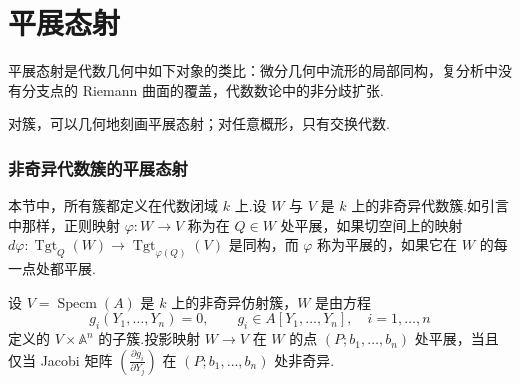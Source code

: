 ﻿%
\chapter{平展态射}\label{sec:2}

平展态射是代数几何中如下对象的类比：微分几何中流形的局部同构，复分析中没有分支点的 Riemann 曲面的覆盖，代数数论中的非分歧扩张.

对簇，可以几何地刻画平展态射；对任意概形，只有交换代数.

\subsection*{非奇异代数簇的平展态射}

本节中，所有簇都定义在代数闭域 $k$ 上.设 $W$ 与 $V$ 是 $k$ 上的非奇异代数簇.如引言中那样，正则映射 $\varphi \colon W \to V$ 称为在 $Q \in W$ 处平展，如果切空间上的映射 $d\varphi \colon \operatorname{Tgt}_{Q}(W) \to \operatorname{Tgt}_{\varphi(Q)}(V)$ 是同构，而 $\varphi$ 称为平展的，如果它在 $W$ 的每一点处都平展.

\begin{proposition}\label{prop:2.1}
设 $V = \operatorname{Specm}(A)$ 是 $k$ 上的非奇异仿射簇，$W$ 是由方程
\[
g_{i}(Y_1, \ldots, Y_n) = 0, \qquad g_{i} \in A[Y_1, \ldots, Y_n], \quad i = 1, \ldots, n
\]
定义的 $V \times \mathbb{A}^{n}$ 的子簇.投影映射 $W \to V$ 在 $W$ 的点 $(P; b_1, \ldots, b_n)$ 处平展，当且仅当 Jacobi 矩阵 $\left(\frac{\partial g_i}{\partial Y_j}\right)$ 在 $(P; b_1, \ldots, b_n)$ 处非奇异.
\end{proposition}

